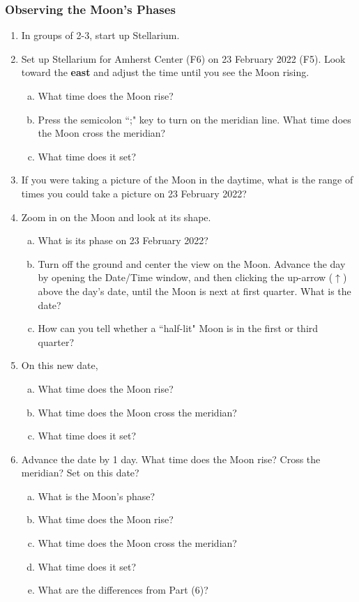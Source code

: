 \documentclass[main.tex]{subfiles}
\begin{document}
\subsubsection{Observing the Moon's Phases}
\begin{enumerate}
\item In groups of 2-3, start up Stellarium.

\item Set up Stellarium for Amherst Center (F6) on 23 February 2022 (F5). Look toward the \textbf{east} and adjust the time until you see the Moon rising.
	\begin{enumerate}[a.]
	\item What time does the Moon rise?
	\item Press the semicolon ``;" key to turn on the meridian line. What time does the Moon cross the meridian?
	\item What time does it set?
	\end{enumerate}

\item If you were taking a picture of the Moon in the daytime, what is the range of times you could take a picture on 23 February 2022?

\item Zoom in on the Moon and look at its shape. 
	\begin{enumerate}[a.]
	\item What is its phase on 23 February 2022?
	\item Turn off the ground and center the view on the Moon. Advance the day by opening the Date/Time window, and then clicking the up-arrow ($\uparrow$) above the day's date, until the Moon is next at first quarter. What is the date?
	\item How can you tell whether a ``half-lit" Moon is in the first or third quarter?
	\end{enumerate}

\item On this new date,
	\begin{enumerate}[a.]
	\item What time does the Moon rise?
	\item What time does the Moon cross the meridian?
	\item What time does it set?
	\end{enumerate}

\item Advance the date by 1 day. What time does the Moon rise? Cross the meridian? Set on this date?
	\begin{enumerate}[a.]
	\item What is the Moon's phase?
	\item What time does the Moon rise?
	\item What time does the Moon cross the meridian?
	\item What time does it set?
	\item What are the differences from Part (6)?
	\end{enumerate}


\end{enumerate}
\end{document}
